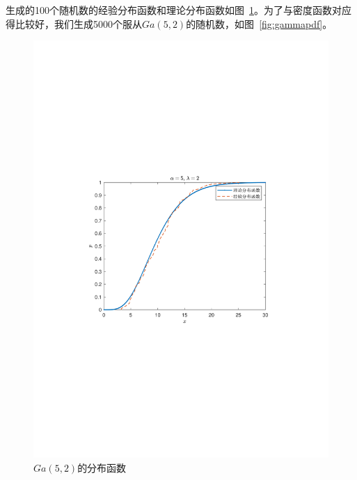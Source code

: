 生成的100个随机数的经验分布函数和理论分布函数如图~\ref{fig:gammacdf}。为了与密度函数对应得比较好，我们生成5000个服从$Ga(5,2)$的随机数，如图~\ref{fig:gammapdf}。
\begin{figure}[htbp]
    \begin{minipage}[t]{0.5\textwidth}
        \centering
        \includegraphics[width = \textwidth]{image/gammacdf.pdf}
        \caption{$Ga(5, 2)$的分布函数}
        \label{fig:gammacdf}
    \end{minipage}
    \hfill
    \begin{minipage}[t]{0.5\textwidth}
        \centering

\end{minipage}
\end{figure}
